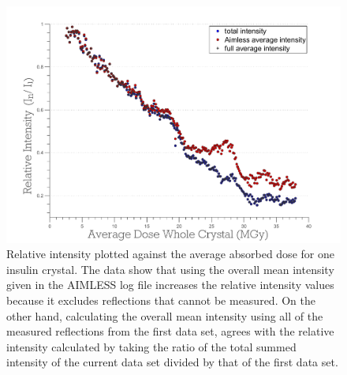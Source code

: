 \begin{figure}
  \centering
    \includegraphics[width=1\textwidth]{figures/dwd/calcrelint.pdf}
    \caption[Relative intensity plotted against the average absorbed dose for one insulin crystal.]{Relative intensity plotted against the average absorbed dose for one insulin crystal. The data show that using the overall mean intensity given in the AIMLESS log file increases the relative intensity values because it excludes reflections that cannot be measured. On the other hand, calculating the overall mean intensity using all of the measured reflections from the first data set, agrees with the relative intensity calculated by taking the ratio of the total summed intensity of the current data set divided by that of the first data set.}
    \label{figrelint}
\end{figure}
